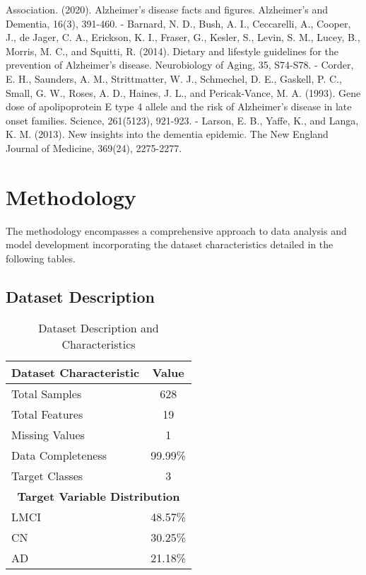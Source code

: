 \documentclass[conference]{IEEEtran}
\begin{document}
Association. (2020). Alzheimer's disease facts and figures. Alzheimer's and Dementia, 16(3), 391-460. - Barnard, N. D., Bush, A. I., Ceccarelli, A., Cooper, J., de Jager, C. A., Erickson, K. I., Fraser, G., Kesler, S., Levin, S. M., Lucey, B., Morris, M. C., and Squitti, R. (2014). Dietary and lifestyle guidelines for the prevention of Alzheimer's disease. Neurobiology of Aging, 35, S74-S78. - Corder, E. H., Saunders, A. M., Strittmatter, W. J., Schmechel, D. E., Gaskell, P. C., Small, G. W., Roses, A. D., Haines, J. L., and Pericak-Vance, M. A. (1993). Gene dose of apolipoprotein E type 4 allele and the risk of Alzheimer's disease in late onset families. Science, 261(5123), 921-923. - Larson, E. B., Yaffe, K., and Langa, K. M. (2013). New insights into the dementia epidemic. The New England Journal of Medicine, 369(24), 2275-2277.

\section{Methodology}
The methodology encompasses a comprehensive approach to data analysis and model development incorporating the dataset characteristics detailed in the following tables.

\subsection{Dataset Description}

\begin{table}[!h]
\centering
\caption{Dataset Description and Characteristics}
\label{tab:dataset_description}
\begin{tabular}{|l|c|}
\hline
\textbf{Dataset Characteristic} & \textbf{Value} \\
\hline
Total Samples & 628 \\
\hline
Total Features & 19 \\
\hline
Missing Values & 1 \\
\hline
Data Completeness & 99.99\% \\
\hline
Target Classes & 3 \\
\hline
\hline
\multicolumn{2}{|c|}{\textbf{Target Variable Distribution}} \\
\hline
LMCI & 48.57\% \\
\hline
CN & 30.25\% \\
\hline
AD & 21.18\% \\
\hline
\end{tabular}
\end{table}
\end{document}
